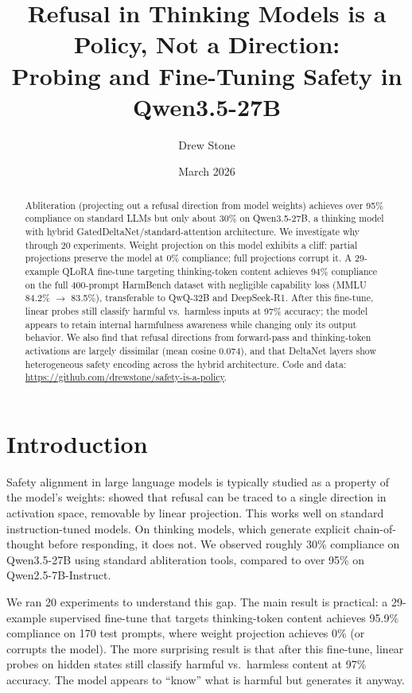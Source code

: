 \documentclass{article}
\title{Refusal in Thinking Models is a Policy, Not a Direction:\\Probing and Fine-Tuning Safety in Qwen3.5-27B}
\author{Drew Stone}
\date{March 2026}
\begin{document}
\maketitle

\begin{abstract}
Abliteration (projecting out a refusal direction from model weights) achieves over 95\% compliance on standard LLMs but only about 30\% on Qwen3.5-27B, a thinking model with hybrid GatedDeltaNet/standard-attention architecture. We investigate why through 20 experiments. Weight projection on this model exhibits a cliff: partial projections preserve the model at 0\% compliance; full projections corrupt it. A 29-example QLoRA fine-tune targeting thinking-token content achieves 94\% compliance on the full 400-prompt HarmBench dataset with negligible capability loss (MMLU 84.2\% $\to$ 83.5\%), transferable to QwQ-32B and DeepSeek-R1. After this fine-tune, linear probes still classify harmful vs.\ harmless inputs at 97\% accuracy; the model appears to retain internal harmfulness awareness while changing only its output behavior. We also find that refusal directions from forward-pass and thinking-token activations are largely dissimilar (mean cosine 0.074), and that DeltaNet layers show heterogeneous safety encoding across the hybrid architecture. Code and data: \url{https://github.com/drewstone/safety-is-a-policy}.
\end{abstract}

\section{Introduction}
\label{sec:intro}

Safety alignment in large language models is typically studied as a property of the model's weights: \citet{arditi2024refusal} showed that refusal can be traced to a single direction in activation space, removable by linear projection. This works well on standard instruction-tuned models. On thinking models, which generate explicit chain-of-thought before responding, it does not. We observed roughly 30\% compliance on Qwen3.5-27B using standard abliteration tools, compared to over 95\% on Qwen2.5-7B-Instruct.

We ran 20 experiments to understand this gap. The main result is practical: a 29-example supervised fine-tune that targets thinking-token content achieves 95.9\% compliance on 170 test prompts, where weight projection achieves 0\% (or corrupts the model). The more surprising result is that after this fine-tune, linear probes on hidden states still classify harmful vs.\ harmless content at 97\% accuracy. The model appears to ``know'' what is harmful but generates it anyway.
\end{document}
